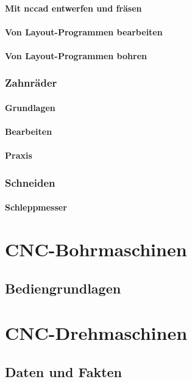\documentclass[a4paper]{book}
\begin{document}
			\subsubsection{Mit nccad entwerfen und fräsen} 
			\subsubsection{Von Layout-Programmen bearbeiten} 
			\subsubsection{Von Layout-Programmen bohren} 
		\subsection{Zahnräder} 
			\subsubsection{Grundlagen} 
			\subsubsection{Bearbeiten} 
			\subsubsection{Praxis} 			
		\subsection{Schneiden} 
			\subsubsection{Schleppmesser} 
		 
\chapter{CNC-Bohrmaschinen} 
	\section{Bediengrundlagen}

\chapter{CNC-Drehmaschinen}
	\section{Daten und Fakten} 
\end{document}

